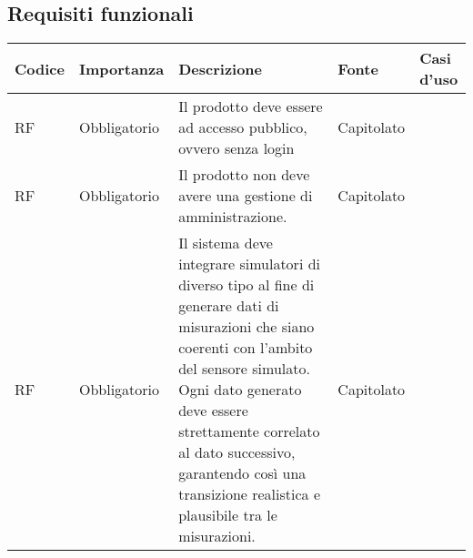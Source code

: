 \subsection{Requisiti funzionali}

\begin{longtable}{|C{1cm}|C{2cm}|>{\raggedright}m{5cm}|C{2cm}|C{1.5cm}|}
    \hline
    \textbf{Codice}                                & \textbf{Importanza} & \textbf{Descrizione}                                                                                                                                                                                                               & \textbf{Fonte}  & \textbf{Casi d'uso} \\
    \hline
    RF                          & Obbligatorio        & Il prodotto deve essere ad accesso pubblico, ovvero senza login                                                                                                                                                                    & Capitolato      &                     \\
    \hline
     RF & Obbligatorio        & Il prodotto non deve avere una gestione di amministrazione.                                                                                                                                                                        & Capitolato      &                     \\
    \hline
     RF & Obbligatorio        &  Il sistema deve integrare simulatori di diverso tipo al fine di generare dati di misurazioni che siano coerenti con l'ambito del sensore simulato. Ogni dato generato deve essere strettamente correlato al dato successivo, garantendo così una transizione realistica e plausibile tra le misurazioni.                                                                                                                                            & Capitolato      &                \\
    \hline


\end{longtable}
